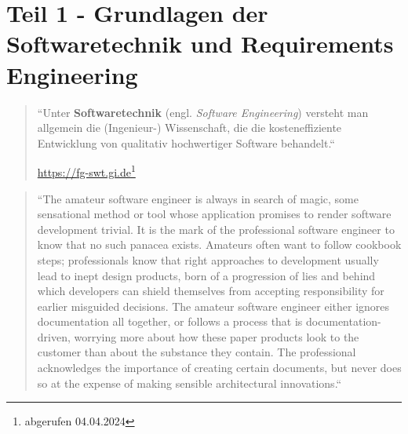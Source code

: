 \chapter*{Teil 1 - Grundlagen der Softwaretechnik und Requirements Engineering}

\vspace{2cm}
\blockquote[{\url{https://fg-swt.gi.de}\footnote{abgerufen 04.04.2024}}]{``Unter \textbf{Softwaretechnik} (engl. \textit{Software Engineering}) versteht man allgemein die (Ingenieur-) Wissenschaft, die die kosteneffiziente Entwicklung von qualitativ hochwertiger Software behandelt.``}
\vspace{2cm}
\blockquote[{\cite[247]{BMEY07}}]{
    ``The amateur software engineer is always in search
    of magic, some sensational method or tool whose
    application promises to render software development trivial. It is the mark of the professional software engineer to know that no such panacea exists.
    Amateurs often want to follow cookbook steps; professionals know that right approaches to development usually lead to inept design products, born of a
    progression of lies and behind which developers can
    shield themselves from accepting responsibility for
    earlier misguided decisions. The amateur software
    engineer either ignores documentation all together,
    or follows a process that is documentation-driven,
    worrying more about how these paper products look
    to the customer than about the substance they contain. The professional acknowledges the importance
    of creating certain documents, but never does so at
    the expense of making sensible architectural innovations.``
}